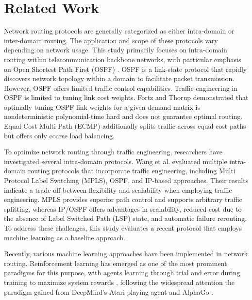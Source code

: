 \section{Related Work} %
Network routing protocols are generally categorized as either intra-domain or inter-domain routing. The application and scope of these protocols vary depending on network usage. This study primarily focuses on intra-domain routing within telecommunication backbone networks, with particular emphasis on Open Shortest Path First (OSPF) \cite{rfc2328}. OSPF is a link-state protocol that rapidly discovers network topology within a domain to facilitate packet transmission. However, OSPF offers limited traffic control capabilities. Traffic engineering in OSPF is limited to tuning link cost weights. Fortz and Thorup \cite{832225} demonstrated that optimally tuning OSPF link weights for a given demand matrix is nondeterministic polynomial-time hard and does not guarantee optimal routing. Equal-Cost Multi-Path (ECMP) additionally splits traffic across equal-cost paths but offers only coarse load balancing.

To optimize network routing through traffic engineering, researchers have investigated several intra-domain protocols. Wang et al. \cite{article} evaluated multiple intra-domain routing protocols that incorporate traffic engineering, including Multi Protocol Label Switching (MPLS), OSPF, and IP-based approaches. Their results indicate a trade-off between flexibility and scalability when employing traffic engineering. MPLS provides superior path control and supports arbitrary traffic splitting, whereas IP/OSPF offers advantages in scalability, reduced cost due to the absence of Label Switched Path (LSP) state, and automatic failure rerouting. To address these challenges, this study evaluates a recent protocol that employs machine learning as a baseline approach.

Recently, various machine learning approaches have been implemented in network routing. Reinforcement learning has emerged as one of the most prominent paradigms for this purpose, with agents learning through trial and error during training to maximize system rewards \cite{SHAKARAMI2020107496, sutton_reinforcement_2018}, following the widespread attention the paradigm gained from DeepMind's Atari-playing agent and AlphaGo \cite{shaheen2026reinforcementlearningstrategybasedatari}.

